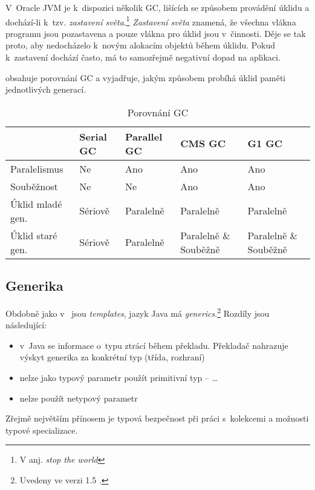 V~Oracle JVM je k~dispozici několik GC, lišících se způsobem provádění úklidu a dochází-li k~tzv. \emph{zastavení světa}.\footnote{V anj. \emph{stop the world}}
\emph{Zastavení světa} znamená, že všechna vlákna programu jsou pozastavena a pouze vlákna pro úklid jsou v~činnosti.
Děje se tak proto, aby nedocházelo k~novým alokacím objektů během úklidu.
Pokud k~zastavení dochází často, má to samozřejmě negativní dopad na aplikaci.

 obsahuje porovnání GC a vyjadřuje, jakým způsobem probíhá úklid paměti jednotlivých generací.

\begin{table}
\center
\begin{tabular}{|l || l | l | p{2cm} | p{2cm} |}
\hline
& Serial GC & Parallel GC & CMS GC & G1 GC \\ \hline \hline
Paralelismus & Ne & Ano & Ano & Ano \\ \hline
Souběžnost & Ne & Ne & Ano & Ano \\ \hline
Úklid mladé gen. & Sériově & Paralelně & Paralelně & Paralelně \\ \hline
Úklid staré gen. & Sériově & Paralelně & Paralelně \& \mbox{Souběžně} & Paralelně \& \mbox{Souběžně} \\
 \hline
\end{tabular}
\caption{Porovnání GC}
\label{tab:gcs}
\end{table}

\subsection{Generika\label{sub:generika}}

Obdobně jako v~\CC{} jsou \emph{templates}\cite{ISO:2012:CPP}, jazyk Java má \emph{generics}.\footnote{Uvedeny ve verzi 1.5 \cite{gosling2013java}.}
Rozdíly jsou následující:
\begin{itemize}
  \item v~Java se informace o~typu ztrácí během překladu. Překladač nahrazuje výskyt generika za konkrétní typ (třída, rozhraní)
  \item nelze jako typový parametr použít primitivní typ --  \ldots{}
  \item nelze použít netypový parametr
\end{itemize}

Zřejmě největším přínosem je typová bezpečnost při práci s~kolekcemi a možnosti typové specializace.


